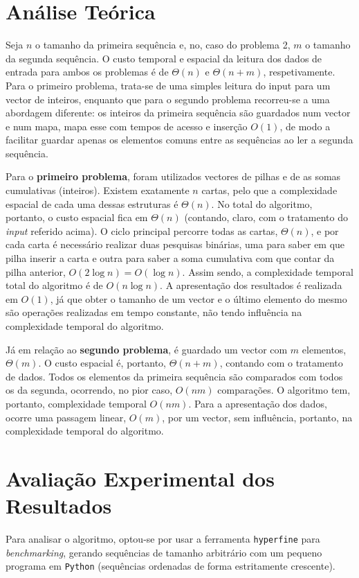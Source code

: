 \documentclass[12pt]{article}
\begin{document}
\section{Análise Teórica}
Seja $n$ o tamanho da primeira sequência e, no, caso do problema 2, $m$ o tamanho da segunda sequência.
O custo temporal e espacial da leitura dos dados de entrada para ambos os problemas é de $\Theta(n)$ e $\Theta(n + m)$, respetivamente. Para o primeiro problema, trata-se de uma simples leitura do input para um vector de inteiros, enquanto que para o segundo problema recorreu-se a uma abordagem diferente: os inteiros da primeira sequência são guardados num vector e num mapa, mapa esse com tempos de acesso e inserção $O(1)$, de modo a facilitar guardar apenas os elementos comuns entre as sequências ao ler a segunda sequência.

\vspace{0.5mm}

Para o \textbf{primeiro problema}, foram utilizados vectores de pilhas e de as somas cumulativas (inteiros). Existem exatamente $n$ cartas, pelo que a complexidade espacial de cada uma dessas estruturas é $\Theta(n)$. No total do algoritmo, portanto, o custo espacial fica em $\Theta(n)$ (contando, claro, com o tratamento do \textit{input} referido acima). O ciclo principal percorre todas as cartas, $\Theta(n)$, e por cada carta é necessário realizar duas pesquisas binárias, uma para saber em que pilha inserir a carta e outra para saber a soma cumulativa com que contar da pilha anterior, $O(2\log{n}) = O(\log{n})$. Assim sendo, a complexidade temporal total do algoritmo é de $O(n\log{n})$. A apresentação dos resultados é realizada em $O(1)$, já que obter o tamanho de um vector e o último elemento do mesmo são operações realizadas em tempo constante, não tendo influência na complexidade temporal do algoritmo.

\vspace{0.5mm}

Já em relação ao \textbf{segundo problema}, é guardado um vector com $m$ elementos, $\Theta(m)$. O custo espacial é, portanto, $\Theta(n + m)$, contando com o tratamento de dados. Todos os elementos da primeira sequência são comparados com todos os da segunda, ocorrendo, no pior caso, $O(nm)$ comparações. O algoritmo tem, portanto, complexidade temporal $O(nm)$. Para a apresentação dos dados, ocorre uma passagem linear, $O(m)$, por um vector, sem influência, portanto, na complexidade temporal do algoritmo.

\section{Avaliação Experimental dos Resultados}
Para analisar o algoritmo, optou-se por usar a ferramenta \texttt{hyperfine} para \textit{benchmarking}, gerando sequências de tamanho arbitrário com um pequeno programa em \texttt{Python} (sequências ordenadas de forma estritamente crescente).
\end{document}
